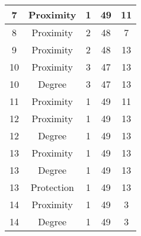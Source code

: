 \documentclass[results.tex]{subfiles}
\begin{document}
\begin{center}
\begin{tabular}{| c || c | c | c | c |}
            \hline
            7                       & Proximity                    & 1                      & 49                      & 11                   \\
            \hline
            8                       & Proximity                    & 2                      & 48                      & 7                    \\
            \hline
            9                       & Proximity                    & 2                      & 48                      & 13                   \\
            \hline
            10                      & Proximity                    & 3                      & 47                      & 13                   \\
            \hline
            10                      & Degree                       & 3                      & 47                      & 13                   \\
            \hline
            11                      & Proximity                    & 1                      & 49                      & 11                   \\
            \hline
            12                      & Proximity                    & 1                      & 49                      & 13                   \\
            \hline
            12                      & Degree                       & 1                      & 49                      & 13                   \\
            \hline
            13                      & Proximity                    & 1                      & 49                      & 13                   \\
            \hline
            13                      & Degree                       & 1                      & 49                      & 13                   \\
            \hline
            13                      & Protection                   & 1                      & 49                      & 13                   \\
            \hline
            14                      & Proximity                    & 1                      & 49                      & 3                    \\
            \hline
            14                      & Degree                       & 1                      & 49                      & 3                    \\

\end{tabular}
\end{center}
\end{document}

